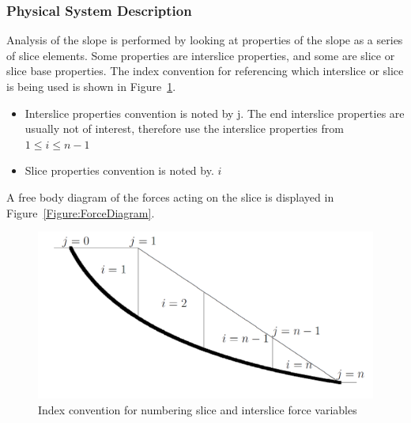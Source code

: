 \documentclass[12pt]{article}
\begin{document}
\subsubsection{Physical System Description}
\label{Sec:PhysSyst}
Analysis of the slope is performed by looking at properties of the slope as a series of slice elements. Some properties are interslice properties, and some are slice or slice base properties. The index convention for referencing which interslice or slice is being used is shown in Figure~\ref{Figure:IndexConvention}.
\begin{itemize}
\item{Interslice properties convention is noted by j. The end interslice properties are usually not of interest, therefore use the interslice properties from $1\leq{}i\leq{}n-1$}
\item{Slice properties convention is noted by. $i$}
\end{itemize}
A free body diagram of the forces acting on the slice is displayed in Figure~\ref{Figure:ForceDiagram}.
\begin{figure}
\begin{center}
\includegraphics[width=\textwidth]{IndexConvention.png}
\caption{Index convention for numbering slice and interslice force variables}
\label{Figure:IndexConvention}
\end{center}
\end{figure}
\end{document}
